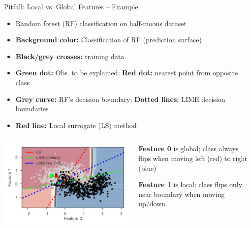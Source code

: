 \documentclass[10pt,compress,t,notes=noshow, xcolor=table]{beamer}
\begin{document}
\begin{frame}{Pitfall: Local vs. Global Features -- Example}
\begin{itemize}
		\item Random forest (RF) classification on half-moons dataset
		    \item \textbf{Background color:} Classification of RF (prediction surface)
		    \item \textbf{Black/grey crosses:} training data
            \item \textbf{Green dot:} Obs. to be explained; \textbf{Red dot:} nearest point from opposite class
		    \item \textbf{Grey curve:} RF's decision boundary; \textbf{Dotted lines:} LIME decision boundaries
             \item \textbf{Red line:} Local surrogate (LS) method 
	\end{itemize}

    
\begin{columns}[T, totalwidth=\textwidth]
  \begin{column}{0.63\textwidth}
	\includegraphics[width=\textwidth, trim = 5px 5px 0px 10px, clip]{figure/lime-globallocal2}
  \end{column}
  \pause
  \begin{column}{0.37\textwidth}
  \textbf{Feature 0} is global;
  class always flips when moving left (red) to right (blue)
  \medskip
  
  \textbf{Feature 1} is local;
  class flips only near boundary when moving up/down
\medskip


\end{column}
\end{columns}
\end{frame}
\end{document}
